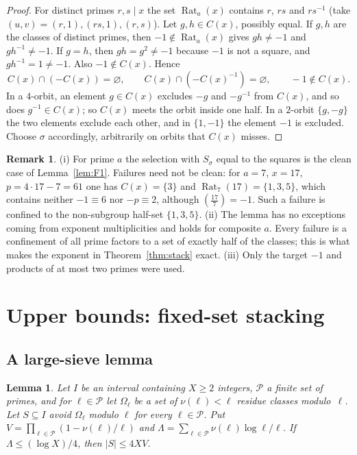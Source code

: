 \documentclass[11pt,reqno]{amsart}
\newtheorem{lemma}[theorem]{Lemma}
\theoremstyle{definition}
\newtheorem{remark}[theorem]{Remark}
\newcommand{\Rat}{\operatorname{Rat}}
\newcommand{\leg}[2]{\left(\frac{#1}{#2}\right)}
\begin{document}
\begin{proof}
For distinct primes $r,s\mid x$ the set $\Rat_a(x)$ contains $r$, $rs$ and
$rs^{-1}$ (take $(u,v)=(r,1),(rs,1),(r,s)$).  Let $g,h\in C(x)$, possibly
equal.  If $g,h$ are the classes of distinct primes, then $-1\notin\Rat_a(x)$
gives $gh\ne-1$ and $gh^{-1}\ne-1$.  If $g=h$, then $gh=g^2\ne-1$ because
$-1$ is not a square, and $gh^{-1}=1\neq-1$.  Also $-1\notin C(x)$.  Hence
\[
 C(x)\cap(-C(x))=\varnothing,\qquad C(x)\cap(-C(x)^{-1})=\varnothing,\qquad -1\notin C(x).
\]
In a $4$-orbit, an element $g\in C(x)$ excludes $-g$ and $-g^{-1}$ from
$C(x)$, and so does $g^{-1}\in C(x)$; so $C(x)$ meets the orbit inside one
half.  In a $2$-orbit $\{g,-g\}$ the two elements exclude each other, and
in $\{1,-1\}$ the element $-1$ is excluded.  Choose $\sigma$ accordingly,
arbitrarily on orbits that $C(x)$ misses.
\end{proof}

\begin{remark}\label{rem:halfset}
(i) For prime $a$ the selection with $S_\sigma$ equal to the squares is the
clean case of Lemma~\ref{lem:F1}.  Failures need not be clean: for
$a=7$, $x=17$, $p=4\cdot17-7=61$ one has $C(x)=\{3\}$ and
$\Rat_7(17)=\{1,3,5\}$, which contains neither $-1\equiv6$ nor
$-p\equiv2$, although $\leg{17}7=-1$.  Such a failure is confined to the
non-subgroup half-set $\{1,3,5\}$.
(ii) The lemma has no exceptions coming from exponent multiplicities and
holds for composite $a$.  Every failure is a confinement of all prime
factors to a set of exactly half of the classes; this is what makes the
exponent in Theorem~\ref{thm:stack} exact.
(iii) Only the target $-1$ and products of at most two primes were used.
\end{remark}

\section{Upper bounds: fixed-set stacking}\label{sec:stack}

\subsection{A large-sieve lemma}

\begin{lemma}\label{lem:LS}
Let $I$ be an interval containing $X\ge2$ integers, $\mathcal P$ a finite set of
primes, and for $\ell\in\mathcal P$ let $\Omega_\ell$ be a set of $\nu(\ell)<\ell$
residue classes modulo~$\ell$.  Let $S\subseteq I$ avoid $\Omega_\ell$ modulo $\ell$
for every $\ell\in\mathcal P$.  Put
$V=\prod_{\ell\in\mathcal P}(1-\nu(\ell)/\ell)$ and
$\Lambda=\sum_{\ell\in\mathcal P}\nu(\ell)\log\ell/\ell$.  If
$\Lambda\le(\log X)/4$, then $|S|\le4XV$.
\end{lemma}
\end{document}
